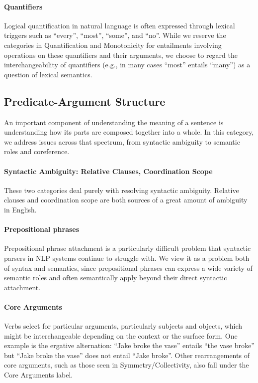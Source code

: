 \documentclass{article} \usepackage{iclr2019_conference,times}
\begin{document}
\paragraph{Quantifiers} Logical quantification in natural language is often expressed through lexical triggers such as ``every'', ``most'', ``some'', and ``no''. While we reserve the categories in Quantification and Monotonicity for entailments involving operations on these quantifiers and their arguments, we choose to regard the interchangeability of quantifiers (e.g., in many cases ``most'' entails ``many'') as a question of lexical semantics.

\subsection{Predicate-Argument Structure}

An important component of understanding the meaning of a sentence is understanding how its parts are composed together into a whole. In this category, we address issues across that spectrum, from syntactic ambiguity to semantic roles and coreference.

\paragraph{Syntactic Ambiguity: Relative Clauses, Coordination Scope}

These two categories deal purely with resolving syntactic ambiguity. Relative clauses and coordination scope are both sources of a great amount of ambiguity in English.

\paragraph{Prepositional phrases} Prepositional phrase attachment is a particularly difficult problem that syntactic parsers in NLP systems continue to struggle with. We view it as a problem both of syntax and semantics, since prepositional phrases can express a wide variety of semantic roles and often semantically apply beyond their direct syntactic attachment.

\paragraph{Core Arguments} Verbs select for particular arguments, particularly subjects and objects, which might be interchangeable depending on the context or the surface form. One example is the ergative alternation: ``Jake broke the vase'' entails ``the vase broke'' but ``Jake broke the vase'' does not entail ``Jake broke''. Other rearrangements of core arguments, such as those seen in Symmetry/Collectivity, also fall under the Core Arguments label.
\end{document}
